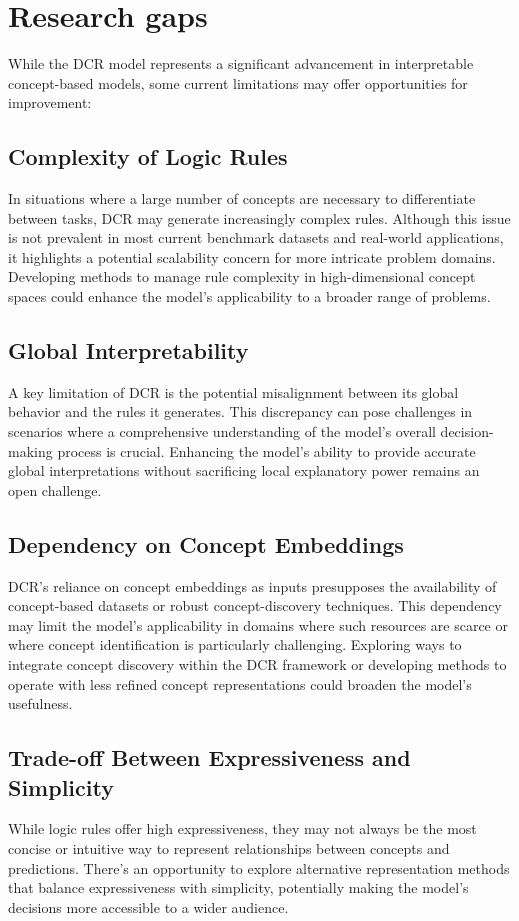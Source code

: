 \documentclass[sigconf, nonacm]{acmart}
\begin{document}
\section{Research gaps}
While the DCR model represents a significant advancement in interpretable concept-based models, some current limitations may offer opportunities for improvement:

\subsection{Complexity of Logic Rules}
In situations where a large number of concepts are necessary to differentiate between tasks, DCR may generate increasingly complex rules. Although this issue is not prevalent in most current benchmark datasets and real-world applications, it highlights a potential scalability concern for more intricate problem domains. Developing methods to manage rule complexity in high-dimensional concept spaces could enhance the model's applicability to a broader range of problems.
\subsection{Global Interpretability}
A key limitation of DCR is the potential misalignment between its global behavior and the rules it generates. This discrepancy can pose challenges in scenarios where a comprehensive understanding of the model's overall decision-making process is crucial. Enhancing the model's ability to provide accurate global interpretations without sacrificing local explanatory power remains an open challenge.
\subsection{Dependency on Concept Embeddings}
DCR's reliance on concept embeddings as inputs presupposes the availability of concept-based datasets or robust concept-discovery techniques. This dependency may limit the model's applicability in domains where such resources are scarce or where concept identification is particularly challenging. Exploring ways to integrate concept discovery within the DCR framework or developing methods to operate with less refined concept representations could broaden the model's usefulness.
\subsection{Trade-off Between Expressiveness and Simplicity}
While logic rules offer high expressiveness, they may not always be the most concise or intuitive way to represent relationships between concepts and predictions. There's an opportunity to explore alternative representation methods that balance expressiveness with simplicity, potentially making the model's decisions more accessible to a wider audience.
\end{document}
